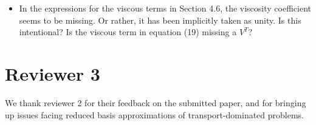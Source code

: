 \documentclass{article}
\newcommand{\bnote}[1]{{\color{blue}{#1}}}
\begin{document}
\begin{itemize}
\item In the expressions for the viscous terms in Section 4.6, the viscosity coefficient seems to be missing. Or rather, it has been implicitly taken as unity. Is this intentional?  Is the viscous term in equation (19) missing a $V^T$?  

\bnote{We thank the reviewer for catching these issues.  The reviewer is correct that these are typos, and we have fixed this in the revised paper.}

\end{itemize}

\section{Reviewer 3}

We thank reviewer 2 for their feedback on the submitted paper, and for bringing up issues facing reduced basis approximations of transport-dominated problems.
\end{document}
